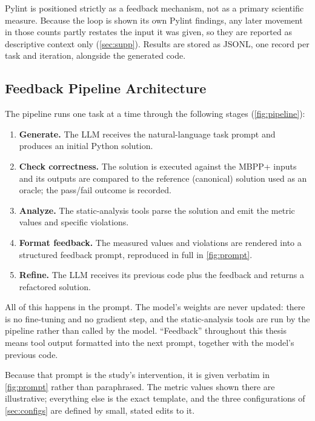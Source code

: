 \noindent Pylint is positioned strictly as a feedback mechanism, not as a primary
scientific measure. Because the loop is shown its own Pylint findings, any later
movement in those counts partly restates the input it was given, so they are
reported as descriptive context only (\cref{sec:supp}). Results are stored as
JSONL, one record per task and iteration, alongside the generated code.

\subsection{Feedback Pipeline Architecture}
The pipeline runs one task at a time through the following stages
(\cref{fig:pipeline}):
\begin{enumerate}
  \item \textbf{Generate.} The LLM receives the natural-language task prompt and
    produces an initial Python solution.
  \item \textbf{Check correctness.} The solution is executed against the MBPP+
    inputs and its outputs are compared to the reference (canonical) solution used
    as an oracle; the pass/fail outcome is recorded.
  \item \textbf{Analyze.} The static-analysis tools parse the solution and emit
    the metric values and specific violations.
  \item \textbf{Format feedback.} The measured values and violations are rendered
    into a structured feedback prompt, reproduced in full in \cref{fig:prompt}.
  \item \textbf{Refine.} The LLM receives its previous code plus the feedback and
    returns a refactored solution.
\end{enumerate}
All of this happens in the prompt. The model's weights are never updated: there is
no fine-tuning and no gradient step, and the static-analysis tools are run by the
pipeline rather than called by the model. ``Feedback'' throughout this thesis means
tool output formatted into the next prompt, together with the model's previous
code.

Because that prompt is the study's intervention, it is given verbatim in
\cref{fig:prompt} rather than paraphrased. The metric values shown there are
illustrative; everything else is the exact template, and the three configurations
of \cref{sec:configs} are defined by small, stated edits to it.

